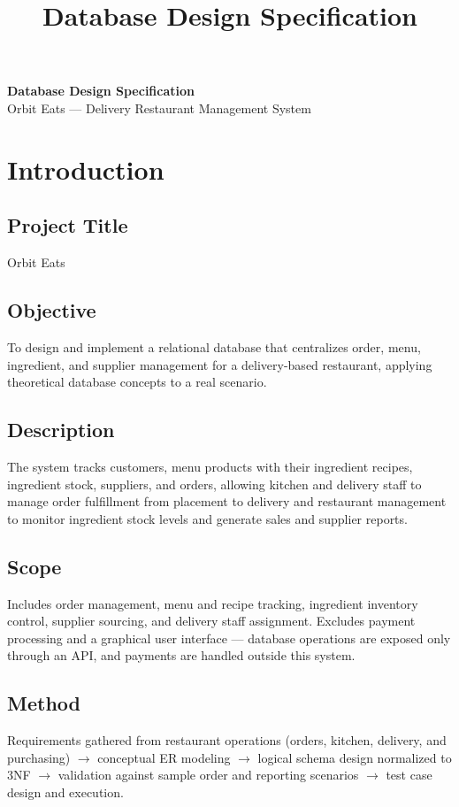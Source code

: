 \documentclass[11pt]{article}
\title{\bfseries Database Design Specification}
\author{}
\date{}
\renewcommand{\_}{\oldunderscore\allowbreak}
\begin{document}
\begin{center}
  {\Huge\bfseries Database Design Specification}\\[0.4em]
  {\large Orbit Eats --- Delivery Restaurant Management System}
\end{center}

\vspace{1.5em}

\section{Introduction}

\subsection{Project Title}
Orbit Eats

\subsection{Objective}
To design and implement a relational database that centralizes order, menu, ingredient, and supplier management for a delivery-based restaurant, applying theoretical database concepts to a real scenario.

\subsection{Description}
The system tracks customers, menu products with their ingredient recipes, ingredient stock, suppliers, and orders, allowing kitchen and delivery staff to manage order fulfillment from placement to delivery and restaurant management to monitor ingredient stock levels and generate sales and supplier reports.

\subsection{Scope}
Includes order management, menu and recipe tracking, ingredient inventory control, supplier sourcing, and delivery staff assignment. Excludes payment processing and a graphical user interface --- database operations are exposed only through an API, and payments are handled outside this system.

\subsection{Method}
Requirements gathered from restaurant operations (orders, kitchen, delivery, and purchasing) $\rightarrow$ conceptual ER modeling $\rightarrow$ logical schema design normalized to 3NF $\rightarrow$ validation against sample order and reporting scenarios $\rightarrow$ test case design and execution.
\end{document}
